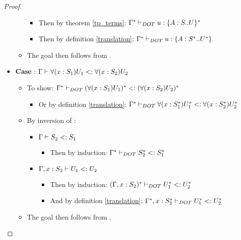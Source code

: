 \begin{proof}
\begin{itemize}
\begin{itemize}
\begin{itemize}
                \item Then by theorem \ref{tp_terms}:
                    $\Gamma^{*} \vdash_{DOT} u: \{A : S .. U\}^{*}$
                \item Then by definition \ref{translation}:
                    $\Gamma^{*} \vdash_{DOT} u: \{A : S^{*} .. U^{*}\}$
            \end{itemize}
            \item The goal then follows from .
        \end{itemize}
        \item \textbf{Case} :
            $\Gamma \vdash \forall(x:S_1)U_1 <: \forall(x:S_2)U_2$
        \begin{itemize}
            \item To show: $\Gamma^{*} \vdash_{DOT} (\forall(x:S_1)U_1)^{*} <: (\forall(x:S_2)U_2)^{*}$
            \begin{itemize}
                \item Or by definition \ref{translation}:
                    $\Gamma^{*} \vdash_{DOT} \forall(x:S_1^{*})U_1^{*} <: \forall(x:S_2^{*})U_2^{*}$
            \end{itemize}
            \item By inversion of :
            \begin{itemize}
                \item $\Gamma \vdash S_2 <: S_1$
                \begin{itemize}
                    \item Then by induction:
                        $\Gamma^{*} \vdash_{DOT} S_2^{*} <: S_1^{*}$
                \end{itemize}
                \item $\Gamma, x: S_2 \vdash U_1 <: U_2$
                \begin{itemize}
                    \item Then by induction: $(\Gamma, x: S_2)^{*} \vdash_{DOT} U_1^{*} <: U_2^{*}$
                    \item And by definition \ref{translation}:
                        $\Gamma^{*}, x:
                        S_2^{*} \vdash_{DOT} U_1^{*} <: U_2^{*}$
                \end{itemize}
            \end{itemize}
            \item The goal then follows from .

\end{itemize}
\end{itemize}
\end{proof}
